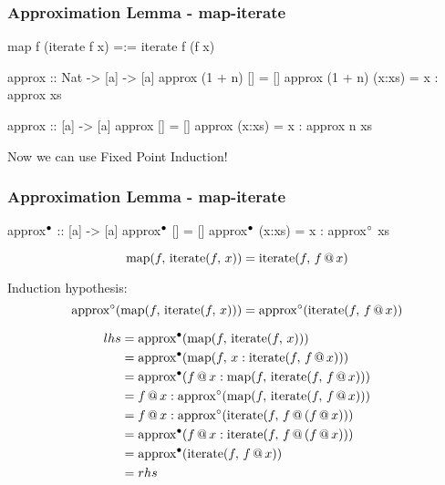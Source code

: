 \documentclass[serif,professionalfont]{beamer}
\begin{document}
\begin{frame}[fragile]
\frametitle{Approximation Lemma - map-iterate}

\pause

\begin{code}
map f (iterate f x) =:= iterate f (f x)
\end{code}

\begin{code}
approx :: Nat -> [a] -> [a]
approx (1 + n) []     = []
approx (1 + n) (x:xs) = x : approx xs
\end{code}

\pause

\begin{code}
approx :: [a] -> [a]
approx []     = []
approx (x:xs) = x : approx n xs
\end{code}

Now we can use Fixed Point Induction!

\end{frame}

\newcommand\iter[2]{\fn{iterate}(#1,\,#2)}
\newcommand\map[2]{\fn{map}(#1,\,#2)}
\newcommand\appw[1]{\fn{\unfix{approx}}(#1)}
\newcommand\appb[1]{\fn{\tofix{approx}}(#1)}

\begin{frame}[fragile]
\frametitle{Approximation Lemma - map-iterate}

\small{
\begin{code}[mathescape]
approx$^{\bullet}$ :: [a] -> [a]
approx$^{\bullet}$ []     = []
approx$^{\bullet}$ (x:xs) = x : approx$^{\circ}$ xs
\end{code}
}

$$\map{f}{\iter{f}{x}} = \iter{f}{\app{f}{x}}$$

\pause

Induction hypothesis:
$$\appw{\map{f}{\iter{f}{x}}} = \appw{\iter{f}{\app{f}{x}}}$$

\pause

\begin{align*}
lhs = & \; \appb{\map{f}{\iter{f}{x}}} \\
    = & \; \appb{\map{f}{x:\iter{f}{\app{f}{x}}}}\\
    = & \; \appb{\app{f}{x} : \map{f}{\iter{f}{\app{f}{x}}}}\\
    = & \; \app{f}{x} : \appw{\map{f}{\iter{f}{\app{f}{x}}}}\\
    = & \; \app{f}{x} : \appw{\iter{f}{\app{f}{(\app{f}{x})}}}\\
    = & \; \appb{\app{f}{x} : \iter{f}{\app{f}{(\app{f}{x})}}}\\
    = & \; \appb{\iter{f}{\app{f}{x}}} \\
    = & \; rhs
\end{align*}

\end{frame}
\end{document}

